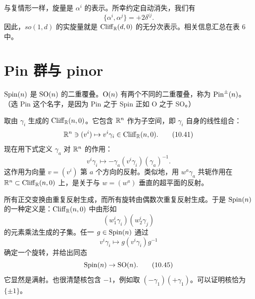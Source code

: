 与复情形一样，旋量是 $\alpha^i$ 的表示。所幸约定自动消失，我们有
\begin{equation}
  \{\alpha^i,\alpha^j\}=+2\delta^{ij}.
  \tag{10.40}
\end{equation}
因此，$so(1,d)$ 的实旋量就是 $\mathrm{Cliff}_{\mathbb{R}}(d,0)$ 的无分次表示。相关信息汇总在表 6 中。


\section{Pin 群与 pinor}

$\mathrm{Spin}(n)$ 是 $\mathrm{SO}(n)$ 的二重覆叠。$\mathrm{O}(n)$ 有两个不同的二重覆叠，称为 $\mathrm{Pin}^\pm(n)$。（选 Pin 这个名字，是因为 Pin 之于 Spin 正如 O 之于 SO。）

取由 $\gamma_i$ 生成的 $\mathrm{Cliff}_{\mathbb{R}}(n,0)$。它包含 $\mathbb{R}^n$ 作为子空间，即 $\gamma_i$ 自身的线性组合：
\begin{equation}
  \mathbb{R}^n\ni(v^i)\mapsto v^i\gamma_i\in\mathrm{Cliff}_{\mathbb{R}}(n,0).
  \tag{10.41}
\end{equation}
现在用下式定义 $\gamma_a$ 对 $\mathbb{R}^n$ 的作用：
\begin{equation}
  v^i\gamma_i\mapsto-\gamma_a(v^i\gamma_i)(\gamma_a)^{-1}.
  \tag{10.42}
\end{equation}
这作用为向量 $v=(v^i)$ 第 $a$ 个方向的反射。类似地，用 $w^a\gamma_a$ 共轭作用在 $\mathbb{R}^n\subset\mathrm{Cliff}_{\mathbb{R}}(n,0)$ 上，是关于与 $w=(w^a)$ 垂直的超平面的反射。

所有正交变换由重复反射生成，而所有旋转由偶数次重复反射生成。于是 $\mathrm{Spin}(n)$ 的一种定义是：$\mathrm{Cliff}_{\mathbb{R}}(n,0)$ 中由形如
\begin{equation}
  (w^i_1\gamma_i)(w^i_2\gamma_j)
  \tag{10.43}
\end{equation}
的元素乘法生成的子集。任一 $g\in\mathrm{Spin}(n)$ 通过
\begin{equation}
  v^i\gamma_i\mapsto g(v^i\gamma_i)g^{-1}
  \tag{10.44}
\end{equation}
确定一个旋转，并给出同态
\begin{equation}
  \mathrm{Spin}(n)\to\mathrm{SO}(n).
  \tag{10.45}
\end{equation}
它显然是满射。也很清楚核包含 $-1$，例如取 $(-\gamma_1)(+\gamma_1)$。可以证明核恰为 $\{\pm1\}$。


